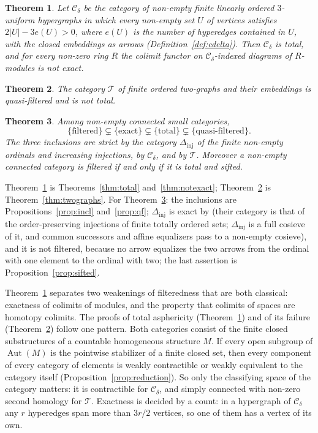 \documentclass[11pt,a4paper]{article}
\newtheorem{theorem}{Theorem}[section]
\theoremstyle{definition}
\newcommand{\Cd}{\mathcal{C}_{\delta}}
\newcommand{\Aut}{\operatorname{Aut}}
\begin{document}
\begin{theorem}\label{thm:A}
Let $\Cd$ be the category of non-empty finite linearly ordered $3$-uniform
hypergraphs
in which every non-empty set $U$ of vertices satisfies $2|U|-3e(U)>0$, where
$e(U)$ is the number of hyperedges contained in $U$, with the closed
embeddings as arrows \textup{(}Definition~\ref{def:cdelta}\textup{)}. Then $\Cd$ is
total, and for every non-zero ring $R$ the colimit functor on $\Cd$-indexed
diagrams of $R$-modules is not exact.
\end{theorem}

\begin{theorem}\label{thm:B}
The category $\mathcal T$ of finite ordered two-graphs and their embeddings
is quasi-filtered and is not total.
\end{theorem}

\begin{theorem}\label{thm:C}
Among non-empty connected small categories,
\[
 \{\text{filtered}\}\subsetneq\{\text{exact}\}\subsetneq\{\text{total}\}
 \subsetneq\{\text{quasi-filtered}\}.
\]
The three inclusions are strict by the category $\Delta_{\mathrm{inj}}$ of
the finite non-empty ordinals and increasing injections, by $\Cd$, and by
$\mathcal T$. Moreover a non-empty connected category is filtered if and
only if it is total and sifted.
\end{theorem}

Theorem~\ref{thm:A} is Theorems~\ref{thm:total} and~\ref{thm:notexact};
Theorem~\ref{thm:B} is Theorem~\ref{thm:twographs}. For
Theorem~\ref{thm:C}: the inclusions are Propositions~\ref{prop:incl}
and~\ref{prop:qf}; $\Delta_{\mathrm{inj}}$ is exact by
\cite[Theorems~1 and~3]{IM73} (their category is that of the order-preserving
injections of finite totally ordered sets; $\Delta_{\mathrm{inj}}$ is a full
cosieve of it, and common successors and affine equalizers pass to a
non-empty cosieve), and it is not filtered, because no arrow
equalizes the two arrows from the ordinal with one element to the ordinal
with two; the last assertion is Proposition~\ref{prop:sifted}.

Theorem~\ref{thm:A} separates two weakenings of filteredness that are both
classical: exactness of colimits of modules, and the property that colimits of
spaces are homotopy colimits. The proofs of total asphericity
(Theorem~\ref{thm:A}) and of its failure (Theorem~\ref{thm:B}) follow one
pattern. Both categories consist of the finite closed substructures of a
countable homogeneous structure $M$. If every open subgroup of $\Aut(M)$ is
the pointwise stabilizer of a finite closed set, then every component of
every category of elements is weakly contractible or weakly equivalent to
the category itself (Proposition~\ref{prop:reduction}). So only the
classifying space of the category matters: it is contractible for $\Cd$, and
simply connected with non-zero second homology for $\mathcal T$. Exactness is
decided by a count: in a hypergraph of $\Cd$ any $r$ hyperedges span more
than $3r/2$ vertices, so one of them has a vertex of its own.
\end{document}
